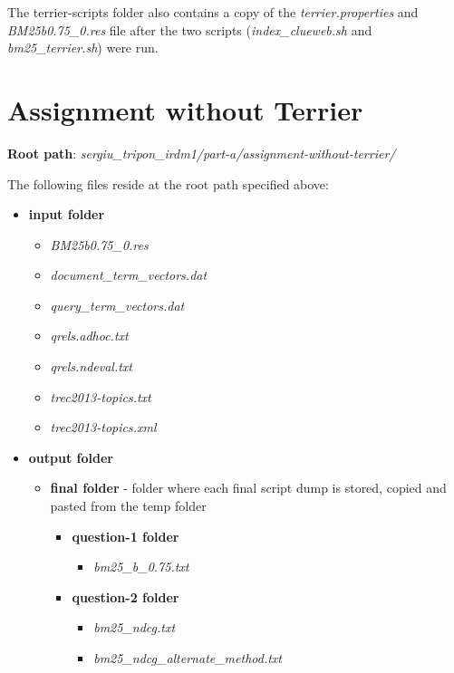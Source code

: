 \documentclass{article} %
\begin{document}
The terrier-scripts folder also contains a copy of the \textit{terrier.properties} and \textit{BM25b0.75\_0.res} file after the two scripts (\textit{index\_clueweb.sh} and \textit{bm25\_terrier.sh}) were run.

\section*{Assignment without Terrier}

\textbf{Root path}: \textit{sergiu\_tripon\_irdm1/part-a/assignment-without-terrier/}

The following files reside at the root path specified above:

\begin{itemize}
    \item \textbf{input folder}
    \begin{itemize}
        \item \textit{BM25b0.75\_0.res}
        \item \textit{document\_term\_vectors.dat}
        \item \textit{query\_term\_vectors.dat}
        \item \textit{qrels.adhoc.txt}
        \item \textit{qrels.ndeval.txt}
        \item \textit{trec2013-topics.txt}
        \item \textit{trec2013-topics.xml}
    \end{itemize}
    \item \textbf{output folder}
    \begin{itemize}
        \item \textbf{final folder} - folder where each final script dump is stored, copied and pasted from the temp folder
        \begin{itemize}
            \item \textbf{question-1 folder}
            \begin{itemize}
                \item \textit{bm25\_b\_0.75.txt}
            \end{itemize}
            \item \textbf{question-2 folder}
            \begin{itemize}
                \item \textit{bm25\_ndcg.txt}
                \item \textit{bm25\_ndcg\_alternate\_method.txt}
            \end{itemize}

\end{itemize}
\end{itemize}
\end{itemize}
\end{document}
